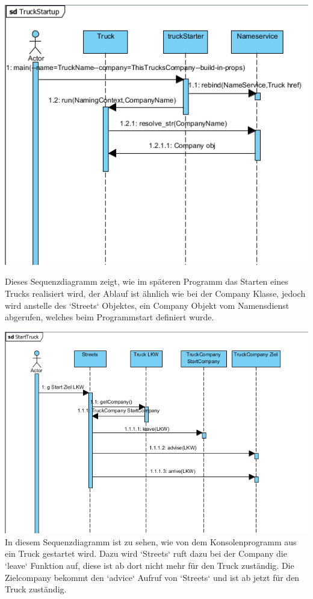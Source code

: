 \documentclass{article}
\begin{document}
\includegraphics[scale=.75]{TruckStartup}

Dieses Sequenzdiagramm zeigt, wie im späteren Programm das Starten eines Trucks realisiert wird, der Ablauf ist ähnlich wie bei der Company Klasse, jedoch wird anstelle des `Streets` Objektes, ein Company Objekt vom Namensdienst abgerufen, welches beim Programmstart definiert wurde.

\includegraphics[scale=.7]{TruckMove}
In diesem Sequenzdiagramm ist zu sehen, wie von dem Konsolenprogramm aus ein Truck gestartet wird. Dazu wird `Streets` ruft dazu bei der Company die `leave` Funktion auf, diese ist ab dort nicht mehr für den Truck zuständig. Die Zielcompany bekommt den `advice` Aufruf von `Streets` und ist ab jetzt für den Truck zuständig.
\end{document}
